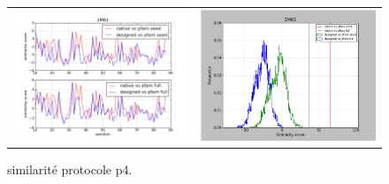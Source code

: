 \documentclass[a4paper,12pt]{article}
\begin{document}
\begin{figure}[t]
\begin{tabular}{cc}
       \includegraphics[width=8.45cm]{gen_08032012/1M61/p4/graph_simil_bypos.png} &
       \includegraphics[width=8.45cm]{gen_08032012/1M61/p4/graph_simil_byseq.png} \\


     \end{tabular}

     \caption{similarité protocole p4.}
   \end{figure}
\end{document}
